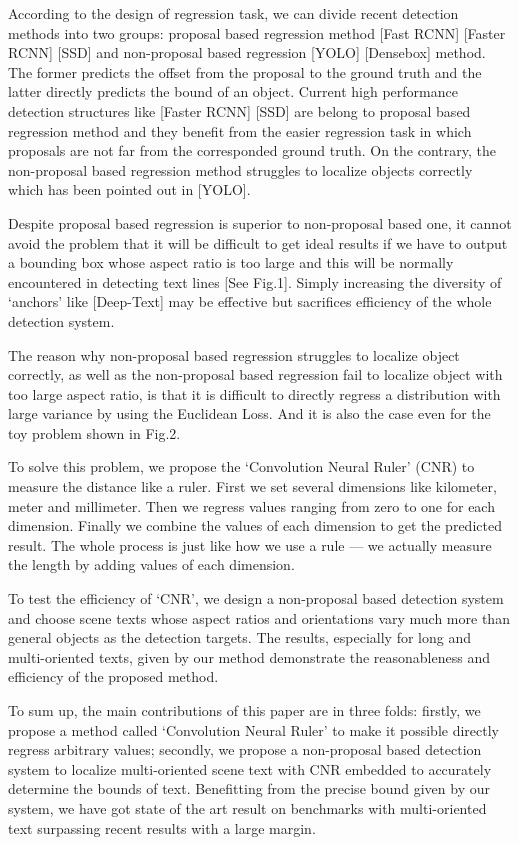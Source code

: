 \documentclass[10pt,twocolumn,letterpaper]{article}
\begin{document}
According to the design of regression task, we can divide recent detection methods into two groups: proposal based regression method [Fast RCNN] [Faster RCNN] [SSD] and non-proposal based regression [YOLO] [Densebox] method. The former predicts the offset from the proposal to the ground truth and the latter directly predicts the bound of an object. Current high performance detection structures like [Faster RCNN] [SSD] are belong to proposal based regression method and they benefit from the easier regression task in which proposals are not far from the corresponded ground truth. On the contrary, the non-proposal based regression method struggles to localize objects correctly which has been pointed out in [YOLO].

Despite proposal based regression is superior to non-proposal based one, it cannot avoid the problem that it will be difficult to get ideal results if we have to output a bounding box whose aspect ratio is too large and this will be normally encountered in detecting text lines [See Fig.1]. Simply increasing the diversity of ‘anchors’ like [Deep-Text] may be effective but sacrifices efficiency of the whole detection system.

The reason why non-proposal based regression struggles to localize object correctly, as well as the non-proposal based regression fail to localize object with too large aspect ratio, is that it is difficult to directly regress a distribution with large variance by using the Euclidean Loss. And it is also the case even for the toy problem shown in Fig.2.

To solve this problem, we propose the ‘Convolution Neural Ruler’ (CNR) to measure the distance like a ruler. First we set several dimensions like kilometer, meter and millimeter. Then we regress values ranging from zero to one for each dimension. Finally we combine the values of each dimension to get the predicted result. The whole process is just like how we use a rule --- we actually measure the length by adding values of each dimension.

To test the efficiency of ‘CNR’, we design a non-proposal based detection system and choose scene texts whose aspect ratios and orientations vary much more than general objects as the detection targets. The results, especially for long and multi-oriented texts, given by our method demonstrate the reasonableness and efficiency of the proposed method.

To sum up, the main contributions of this paper are in three folds: firstly, we propose a method called ‘Convolution Neural Ruler’ to make it possible directly regress arbitrary values; secondly, we propose a non-proposal based detection system to localize multi-oriented scene text with CNR embedded to accurately determine the bounds of text. Benefitting from the precise bound given by our system, we have got state of the art result on benchmarks with multi-oriented text surpassing recent results with a large margin. 
\end{document}
